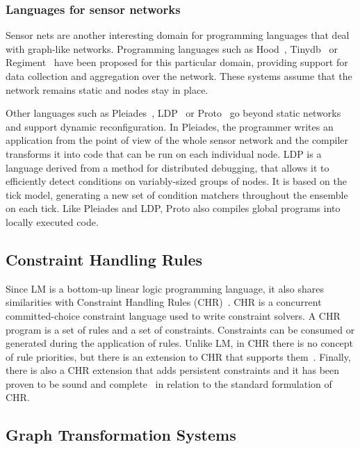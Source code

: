 \subsubsection{Languages for sensor networks}

Sensor nets are another interesting domain for programming languages that deal
with graph-like networks.  Programming languages such as
Hood~\cite{Whitehouse:2004:HNA:990064.990079},
Tinydb~\cite{Madden:2005:TAQ:1061318.1061322} or
Regiment~\cite{Newton:2007:RMS:1236360.1236422} have been proposed for this
particular domain, providing support for data collection and aggregation over
the network.  These systems assume that the network remains static and nodes
stay in place.

Other languages such as Pleiades~\cite{Kothari:2007:REP:1250734.1250757},
LDP~\cite{4543691} or Proto~\cite{Beal:2006:IEE:1137236.1137354} go beyond
static networks and support dynamic reconfiguration. In Pleiades, the
programmer writes an application from the point of view of the whole
sensor network and the compiler transforms it into code that can be run on
each individual node.  LDP is a language derived from a method for
distributed debugging, that allows it to efficiently detect conditions on
variably-sized groups of nodes. It is based on the tick model, generating
a new set of condition matchers throughout the ensemble on each tick.
Like Pleiades and LDP, Proto also compiles global programs into locally
executed code.

\subsection{Constraint Handling Rules}

Since LM is a bottom-up linear logic programming language, it also shares
similarities with Constraint Handling Rules
(CHR)~\cite{Betz:2005kx,Betz:2013:LBA:2422085.2422086}.  CHR is a concurrent
committed-choice constraint language used to write constraint solvers. A CHR
program is a set of rules and a set of constraints. Constraints can be consumed
or generated during the application of rules.  Unlike LM, in CHR there is no
concept of rule priorities, but there is an extension to CHR that supports
them~\cite{DeKoninck:2007:URP:1273920.1273924}.  Finally, there is also a CHR
extension that adds persistent constraints and it has been proven to be sound
and complete~\cite{DBLP:journals/corr/abs-1007-3829} in relation to the standard
formulation of CHR.

\subsection{Graph Transformation Systems}

